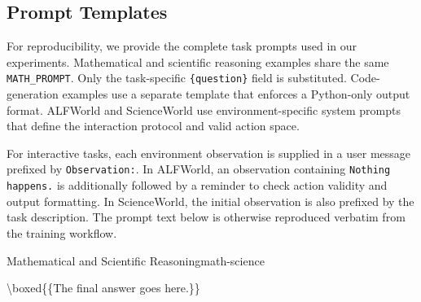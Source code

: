 \subsection{Prompt Templates}
\label{app:prompts}

For reproducibility, we provide the complete task prompts used in our experiments. 
Mathematical and scientific reasoning examples share the same \texttt{MATH\_PROMPT}. 
Only the task-specific \texttt{\{question\}} field is substituted. 
Code-generation examples use a separate template that enforces a Python-only output format. 
ALFWorld and ScienceWorld use environment-specific system prompts that define the interaction protocol and valid action space.

For interactive tasks, each environment observation is supplied in a user message prefixed by \texttt{Observation:}. In ALFWorld, an observation containing \texttt{Nothing happens.} is additionally followed by a reminder to check action validity and output formatting. 
In ScienceWorld, the initial observation is also prefixed by the task description. 
The prompt text below is otherwise reproduced verbatim from the training workflow.

\begin{prompt}{Mathematical and Scientific Reasoning}{math-science}
{\footnotesize\ttfamily\raggedright
{}
\agePromptBlank
{}
\agePromptBlank
{}
\agePromptBlank
{}
\agePromptBlank
{}
\noindent\textbackslash boxed\{\{The final answer goes here.\}\}\par
}
\end{prompt}

